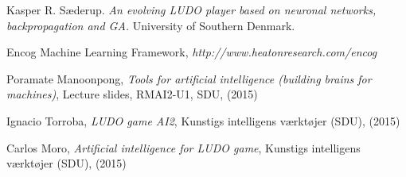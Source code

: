 \begin{thebibliography}{[MT1]}

	Kasper R. Sæderup. 
	\emph{An evolving LUDO player based on neuronal networks, backpropagation and GA.}
	University of Southern Denmark.

	Encog Machine Learning Framework, 
	\emph{http://www.heatonresearch.com/encog}
	
	Poramate Manoonpong, 
	\emph{Tools for artificial intelligence (building brains for machines)},
	Lecture slides, RMAI2-U1, SDU,
	(2015)

	Ignacio Torroba, 
	\emph{LUDO game AI2}, 
	Kunstigs intelligens værktøjer (SDU),
	(2015)

	Carlos Moro, 
	\emph{Artificial intelligence for LUDO game},
	Kunstigs intelligens værktøjer (SDU),
	(2015)


\end{thebibliography}